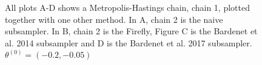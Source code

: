 \begin{figure}[H]
    \caption{All plots A-D shows a Metropolis-Hastings chain, chain 1, plotted together with one other method. In A, chain 2 is the naive subsampler. In B, chain 2 is the Firefly, Figure C is the Bardenet et al. 2014 subsampler and D is the Bardenet et al. 2017 subsampler. $\theta
   ^{\left(0\right)}= \left(-0.2, -0.05\right)$}%
    \label{fig:compare_theta1_normal}%
\end{figure}






